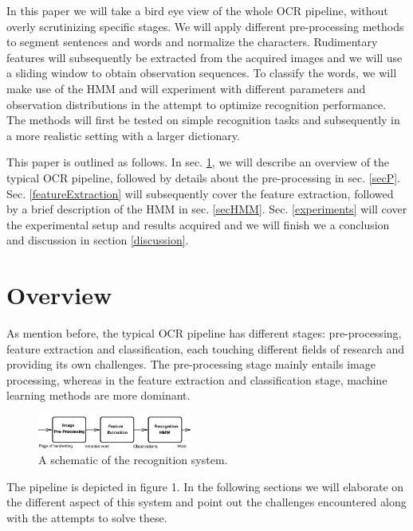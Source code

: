 \documentclass[conference]{IEEEtran}
\begin{document}
In this paper we will take a bird eye view of the whole OCR pipeline, without overly scrutinizing specific stages. We will apply different pre-processing methods to segment sentences and words and normalize the characters. Rudimentary features will subsequently be extracted from the acquired images and we will use a sliding window to obtain observation sequences. To classify the words, we will make use of the HMM and will experiment with different parameters and observation distributions in the attempt to optimize recognition performance. The methods will first be tested on simple recognition tasks and subsequently in a more realistic setting with a larger dictionary.

This paper is outlined as follows. In sec. \ref{overview}, we will describe an overview of the typical OCR pipeline, followed by details about the pre-processing in sec. \ref{secP}. Sec. \ref{featureExtraction} will subsequently cover the feature extraction, followed by a brief description of the HMM in sec. \ref{secHMM}. Sec. \ref{experiments} will cover the experimental setup and results acquired and we will finish we a conclusion and discussion in section \ref{discussion}.

\section{Overview} \label{overview}
As mention before, the typical OCR pipeline has different stages: pre-processing, feature extraction and classification, each touching different fields of research and providing its own challenges. The pre-processing stage mainly entails image processing, whereas in the feature extraction and classification stage, machine learning methods are more dominant.
\begin{figure}
 \centering
\includegraphics[width=0.45\textwidth]{pipeline.png}
\caption{A schematic of the recognition system.}
\label{fig:pipeline}
\end{figure}
The pipeline is depicted in figure 1. In the following sections we will elaborate on the different aspect of this system and point out the challenges encountered along with the attempts to solve these.
\end{document}

